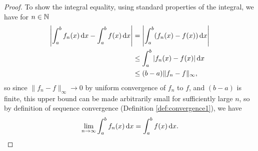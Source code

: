 \documentclass[../analysis1.tex]{subfiles}
\begin{document}
\begin{proof}
    To show the integral equality, using standard properties of the integral, we have for $n\in\mathbb{N}$
    \begin{align*}
        \left|\int_a^b f_n(x)\d{x}-\int_a^b f(x)\d{x}\right|&=\left|\int_a^b (f_n(x)-f(x))\d{x}\right|\\
        &\le \int_a^b |f_n(x)-f(x)|\d{x}\\
        &\le (b-a)\|f_n-f\|_\infty,
    \end{align*}
    so since $\|f_n-f\|_\infty\to 0$ by uniform convergence of $f_n$ to $f$, and $(b-a)$ is finite, this upper bound can be made arbitrarily small for sufficiently large $n$, so by definition of sequence convergence (Definition \ref{def:convergence1}), we have \[\lim_{n\to\infty}\int_a^b f_n(x)\d{x}=\int_a^b f(x)\d{x}.\]\qedhere
\end{proof}
\end{document}
